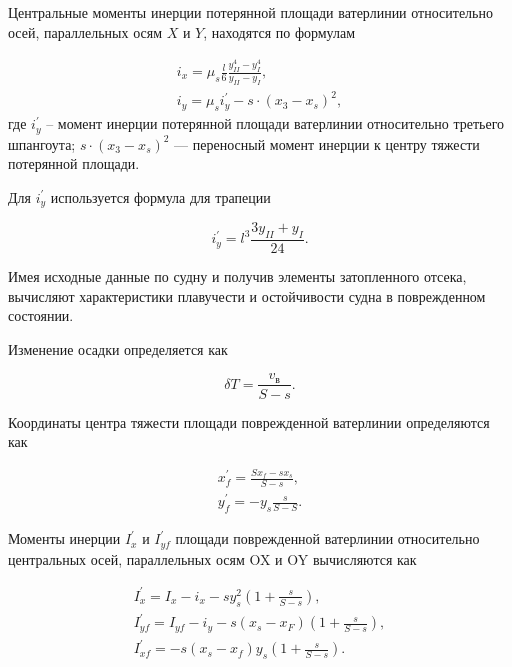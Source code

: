 Центральные моменты инерции потерянной площади ватерлинии относительно осей, параллельных осям $X$ и $Y$, находятся по формулам

\begin{equation}
    \begin{split}
        i_x = \mu_s \frac{l}{6} \frac{y_{II}^4 - y_{I}^4}{y_{II}-y_{I}}, \\
        i_y = \mu_s i_y^\prime - s \cdot(x_3 - x_s)^2,
    \end{split}
\end{equation}
где
$i_y^\prime$ -- момент инерции потерянной площади ватерлинии относительно третьего шпангоута;
$s \cdot(x_3 - x_s)^2$ --- переносный момент инерции к центру тяжести потерянной площади.

Для $i_y^\prime$ используется формула для трапеции

\begin{equation}
    i_y^\prime = l^3 \frac{3y_{II}+y_{I}}{24}.
\end{equation}

Имея исходные данные по судну и получив элементы затопленного отсека, вычисляют характеристики плавучести и остойчивости судна в поврежденном состоянии.

Изменение осадки определяется как

\begin{equation}
    \delta T = \frac{v_{\text{в}}}{S - s}.
\end{equation}

Координаты центра тяжести площади поврежденной ватерлинии определяются как

\begin{equation}
    \begin{split}
        x_f^\prime = \frac{S x_f - s x_s}{S - s}, \\
        y_f^\prime = - y_s \frac{s}{S - S}.
    \end{split}
\end{equation}

Моменты инерции $I_x^\prime$ и $I_{yf}^\prime$ площади поврежденной ватерлинии относительно центральных осей, параллельных осям OX и OY вычисляются как

\begin{equation}
    \begin{split}
        I_x^\prime = I_x - i_x - s y_s^2 (1 + \frac{s}{S - s}), \\
        I_{yf}^\prime = I_{yf} - i_y - s (x_s - x_F) (1 + \frac{s}{S - s}), \\
        I_{xf}^\prime = -s (x_s - x_f) y_s (1 + \frac{s}{S - s}).
    \end{split}
\end{equation}

